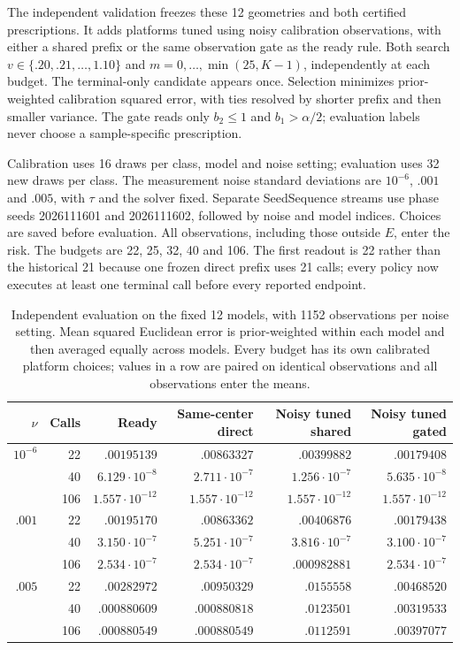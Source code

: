 The independent validation freezes these 12 geometries and both
certified prescriptions. It adds platforms tuned using noisy
calibration observations, with either a shared prefix or the
same observation gate as the ready rule. Both search
$v\in\{.20,.21,\ldots,1.10\}$ and
$m=0,\ldots,\min(25,K-1)$, independently at each budget.
The terminal-only candidate appears once. Selection minimizes
prior-weighted calibration squared error, with ties resolved
by shorter prefix and then smaller variance. The gate reads
only $b_2\le1$ and $b_1>\alpha/2$; evaluation labels never
choose a sample-specific prescription.

Calibration uses 16 draws per class, model and noise setting;
evaluation uses 32 new draws per class. The measurement noise
standard deviations are $10^{-6}$, $.001$ and $.005$,
with $\tau$ and the solver fixed. Separate SeedSequence streams
use phase seeds 2026111601 and 2026111602, followed by noise
and model indices. Choices are saved before evaluation.
All observations, including those outside $E$, enter the risk.
The budgets are 22, 25, 32, 40 and 106. The first readout is
22 rather than the historical 21 because one frozen direct
prefix uses 21 calls; every policy now executes at least one
terminal call before every reported endpoint.

\begin{table}[t]
\centering\small
\setlength{\tabcolsep}{5pt}
\begin{tabular}{@{}rr rrrr@{}}
\toprule
$\nu$ & Calls & Ready & Same-center direct & Noisy tuned shared & Noisy tuned gated\\
\midrule
$10^{-6}$ & 22 & $.00195139$ & $.00863327$ & $.00399882$ & $.00179408$\\
 & 40 & $6.129\cdot10^{-8}$ & $2.711\cdot10^{-7}$ & $1.256\cdot10^{-7}$ & $5.635\cdot10^{-8}$\\
 & 106 & $1.557\cdot10^{-12}$ & $1.557\cdot10^{-12}$ & $1.557\cdot10^{-12}$ & $1.557\cdot10^{-12}$\\
$.001$ & 22 & $.00195170$ & $.00863362$ & $.00406876$ & $.00179438$\\
 & 40 & $3.150\cdot10^{-7}$ & $5.251\cdot10^{-7}$ & $3.816\cdot10^{-7}$ & $3.100\cdot10^{-7}$\\
 & 106 & $2.534\cdot10^{-7}$ & $2.534\cdot10^{-7}$ & $.000982881$ & $2.534\cdot10^{-7}$\\
$.005$ & 22 & $.00282972$ & $.00950329$ & $.0155558$ & $.00468520$\\
 & 40 & $.000880609$ & $.000880818$ & $.0123501$ & $.00319533$\\
 & 106 & $.000880549$ & $.000880549$ & $.0112591$ & $.00397077$\\
\bottomrule
\end{tabular}
\caption{Independent evaluation on the fixed 12 models, with 1152 observations
per noise setting. Mean squared Euclidean error is prior-weighted within each
model and then averaged equally across models. Every budget has its own
calibrated platform choices; values in a row are paired on identical
observations and all observations enter the means.}
\label{tab:independent_budget_controls}
\end{table}

